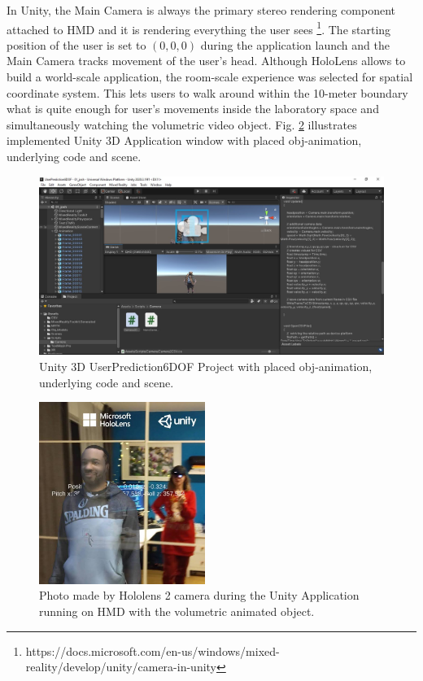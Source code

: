 In Unity, the Main Camera is always the primary stereo rendering component attached to HMD and it is rendering everything the user sees \footnote{https://docs.microsoft.com/en-us/windows/mixed-reality/develop/unity/camera-in-unity}. The starting position of the user is set to $(0, 0, 0)$ during the application launch and the Main Camera tracks movement of the user's head. Although HoloLens allows to build a world-scale application, the room-scale experience was selected for spatial coordinate system. This lets users to walk around within the 10-meter boundary what is quite enough for user's movements inside the laboratory space and simultaneously watching the volumetric video object. Fig. \ref{fig:josh} illustrates implemented Unity 3D Application window with placed obj-animation, underlying code and scene.

\begin{figure}[htb]
	\begin{center}
		\includegraphics[width=1\textwidth, keepaspectratio]{gfx/unity.jpeg}
		\caption{\label{fig:unity} Unity 3D UserPrediction6DOF Project with placed obj-animation, underlying code and scene.}
	\end{center}
\end{figure}
\begin{figure}
	\centering
	\includegraphics[width=0.48\textwidth]{gfx/josh.jpeg}
	\caption{\label{fig:josh}Photo made by Hololens 2 camera during the Unity Application running on HMD with the volumetric animated object.}
\end{figure}

